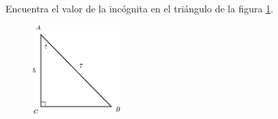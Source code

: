 Encuentra el valor de la incógnita en el triángulo de la figura \ref{fig:angle_functrig_19}.
\begin{figure}[H]
    \begin{center}
        \includegraphics[width=0.3\textwidth]{../images/angle_functrig_19.png}
    \end{center}
    \caption{}
    \label{fig:angle_functrig_19}
\end{figure}